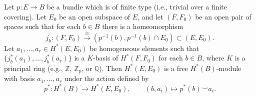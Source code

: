 Let $p: E \to B$ be a bundle which is of finite type (i.e., trivial over a finite covering). Let $E_{0}$ be an open subspace of $E$, and let $(F, F_{0})$ be an open pair of spaces such that for each $b \in B$ there is a homeomorphism
$$
j_{b}: (F, F_{0}) \xrightarrow{\cong} (p^{-1}(b), p^{-1}(b) \cap E_{0}) \subset (E, E_{0}).
$$
Let $a_{1}, \ldots, a_{r} \in H^{*}(E, E_{0})$ be homogeneous elements such that $\{j_{b}^{*}(a_{1}), \ldots, j_{b}^{*}(a_{r})\}$ is a $K$-basis of $H^{*}(F, F_{0})$ for each $b \in B$, where $K$ is a principal ring (e.g., $\mathbb{Z}$, $\mathbb{Z}_{p}$, or $\mathbb{Q}$). Then $H^{*}(E, E_{0})$ is a free $H^{*}(B)$-module with basis $a_{1}, \ldots, a_{r}$ under the action defined by
$$
p^{*}: H^{*}(B) \to H^{*}(E, E_{0}), \qquad (b, a_{i}) \mapsto p^{*}(b) \smile a_{i}.
$$
